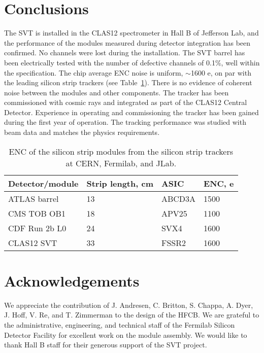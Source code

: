 \section{Conclusions}

The SVT is installed in the CLAS12 spectrometer in Hall B of Jefferson Lab, and the performance of the modules measured during detector integration has been confirmed. No channels were lost during the installation. The SVT barrel has been electrically  tested with the number of defective channels of 0.1$\%$, well within the specification. The chip average ENC noise is uniform, $\sim$1600 e, on par with the leading silicon strip trackers (see Table~\ref{tab:enc-table}). There is no evidence of coherent noise between the modules and other components. The tracker has been commissioned with cosmic rays and integrated as part of the CLAS12 Central Detector. Experience in operating and commissioning the tracker has been gained during the first year of operation. The tracking performance was studied with beam data and matches the physics requirements. 

\begin{table}[hbt]
\begin{tabular}{llll}
\hline
Detector/module      & Strip length, cm & ASIC         & ENC, e\\ \hline
ATLAS barrel           & 13                      & ABCD3A    & 1500  \\
CMS TOB OB1        & 18                      & APV25       & 1100  \\
CDF Run 2b L0        & 24                     & SVX4         & 1600  \\
CLAS12 SVT            & 33                     & FSSR2       & 1600 \\ \hline
\end{tabular}
\caption{ENC of the silicon strip modules from the silicon strip trackers at CERN, Fermilab, and JLab.}
\label{tab:enc-table}
\end{table}

\section{Acknowledgements}

We appreciate the contribution of J.  Andresen, C. Britton, S. Chappa, A. Dyer, J. Hoff, V. Re, and T. Zimmerman to the design of the HFCB. We are grateful to the administrative, engineering, and technical staff of the Fermilab Silicon Detector Facility for excellent work on the module assembly. We would like to thank Hall B staff for their generous support of the SVT project.



